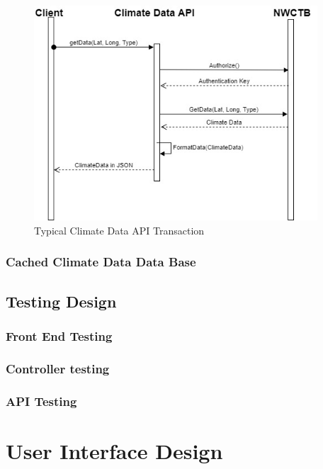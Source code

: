 \documentclass[onecolumn, draftclsnofoot,10pt, compsoc]{article}
\begin{document}
		\begin{figure}[htb]
			\begin{center}
				\includegraphics[width=300pt]{UMLDiagrams/ClimateDataAPITransaction.jpg}
			\end{center}
			\caption{Typical Climate Data API Transaction}
			\label{fig:CDAPITrans}
		\end{figure}
		
				
			
			
			\subsubsection{Cached Climate Data Data Base}

	\subsection{Testing Design}
		\subsubsection{Front End Testing}
	
		\subsubsection{Controller testing}
	
		\subsubsection{API Testing}
		
\section{User Interface Design}
\end{document}

